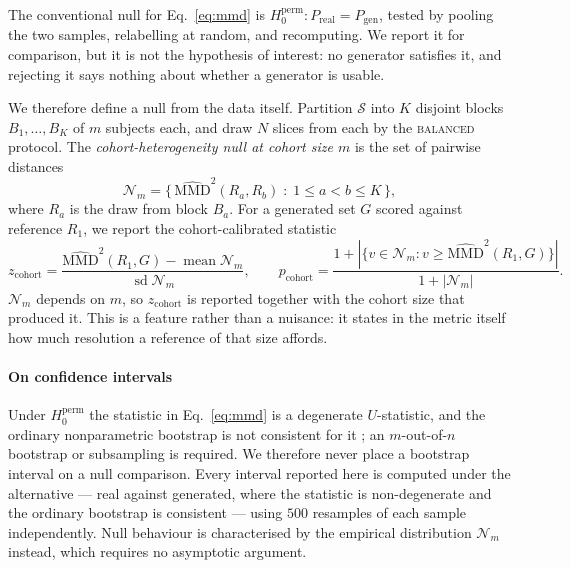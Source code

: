 \documentclass[preprint,12pt,authoryear]{elsarticle}
\newcommand{\mmd}{\mathrm{MMD}}
\begin{document}
The conventional null for Eq.~\eqref{eq:mmd} is
$H_0^{\mathrm{perm}}: P_{\mathrm{real}} = P_{\mathrm{gen}}$, tested by pooling
the two samples, relabelling at random, and recomputing. We report it for
comparison, but it is not the hypothesis of interest: no generator satisfies it,
and rejecting it says nothing about whether a generator is usable.

We therefore define a null from the data itself. Partition $\mathcal{S}$ into
$K$ disjoint blocks $B_1, \dots, B_K$ of $m$ subjects each, and draw $N$ slices
from each by the \textsc{balanced} protocol. The
\emph{cohort-heterogeneity null at cohort size $m$} is the set of pairwise
distances
\begin{equation}
\mathcal{N}_m = \big\{\, \widehat{\mmd}^2(R_a, R_b) \;:\; 1 \le a < b \le K \,\big\},
\label{eq:null}
\end{equation}
where $R_a$ is the draw from block $B_a$. For a generated set $G$ scored
against reference $R_1$, we report the cohort-calibrated statistic
\begin{equation}
z_{\mathrm{cohort}} =
  \frac{\widehat{\mmd}^2(R_1, G) - \operatorname{mean}\mathcal{N}_m}
       {\operatorname{sd}\mathcal{N}_m},
\qquad
p_{\mathrm{cohort}} = \frac{1 + |\{v \in \mathcal{N}_m : v \ge \widehat{\mmd}^2(R_1,G)\}|}
                           {1 + |\mathcal{N}_m|}.
\label{eq:cohortz}
\end{equation}
$\mathcal{N}_m$ depends on $m$, so $z_{\mathrm{cohort}}$ is reported together
with the cohort size that produced it. This is a feature rather than a
nuisance: it states in the metric itself how much resolution a reference of that
size affords.

\paragraph{On confidence intervals}
Under $H_0^{\mathrm{perm}}$ the statistic in Eq.~\eqref{eq:mmd} is a degenerate
$U$-statistic, and the ordinary nonparametric bootstrap is not consistent for
it \citep{arcones1992bootstrap}; an $m$-out-of-$n$ bootstrap or subsampling is
required. We therefore never place a bootstrap interval on a null comparison.
Every interval reported here is computed under the alternative --- real against
generated, where the statistic is non-degenerate and the ordinary bootstrap is
consistent --- using $500$ resamples of each sample independently. Null
behaviour is characterised by the empirical distribution $\mathcal{N}_m$
instead, which requires no asymptotic argument.
\end{document}
